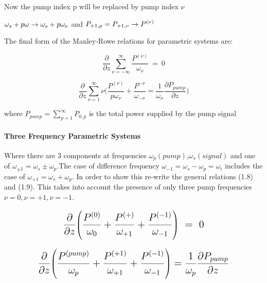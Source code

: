 \documentclass{article}
\begin{document}
Now the pump index p will be replaced by pump index $\nu$ \newline
		
$\mathlarger{\omega_s + p \omega \rightarrow \omega_s + p \omega_\nu }$ and $\mathlarger{P_{+1,p} = P_{+1,\nu} \rightarrow P^{(\nu)} }$ \newline

\small{The final form of the Manley-Rowe relations for parametric systems are:}

\begin{equation}
\frac{\partial}{\partial{z}}\sum_{\nu=-\infty}^{\infty}
\frac{P^{(\nu)}}{ \omega_{\nu}}
~=~0
\end{equation}

\begin{equation}
	\frac{\partial}{\partial{z}}\sum_{\nu=1}^{\infty}
	\nu \Bigg(
	\frac{P^{(\nu)}}{p\omega_{\nu}} + \frac{P^{-\nu}}{\omega_{-\nu}} 
	=
	\frac{1}{\omega_\nu}\frac{\partial{P_{pump}}}{\partial{z}}
	\Bigg)
\end{equation}

\small{where} $P_{pump} = \sum_{p=1}^{\infty} P_{0,p} $ \small{is the total power supplied by the pump signal} \newline

\paragraph{Three Frequency Parametric Systems}

Where there are 3 components at frequencies $\omega_p (pump)$,$\omega_s(signal)$ and one of $ \omega_{\pm 1} = \omega_s \pm \omega_p$.The case of difference frequency $ \omega_{-1} = \omega_s - \omega_p = \omega_i $ includes the case of $\omega_{+1}= \omega_s+ \omega_p$. In order to show this re-write the general relations (1.8) and (1.9). This takes into account the presence of only three pump frequencies $\nu=0, \nu=+1, \nu=-1$. \newline

\begin{equation}
\mathlarger{\mathlarger{
\frac{\partial}{\partial{z}}
\Bigg(
\frac{P^{(0)}}{\omega_0} + \frac{P^{(+)}}{\omega_{+1}} + \frac{P^{(-1)}}{\omega_{-1}}
\Bigg)
~=~0
}}
\end{equation}

\begin{equation}
\mathlarger{\mathlarger{
\frac{\partial}{\partial{z}}
\Bigg(
\frac{P^{(pump)}}{\omega_p} + \frac{P^{(+1)}}{\omega_{+1}} + \frac{P^{(-1)}}{\omega_{-1}} 
\Bigg)
=
\frac{1}{\omega_p}\frac{\partial{P_{pump}}}{\partial{z}}
}}
\end{equation}
\end{document}
